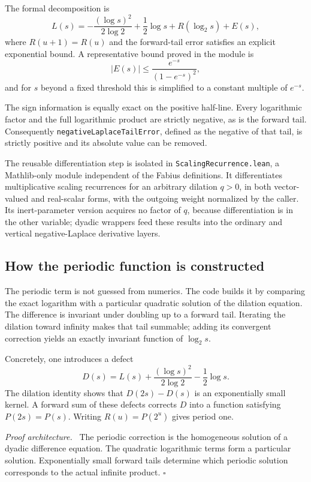 \documentclass[11pt,oneside]{article}
\theoremstyle{definition}
\theoremstyle{remark}
\newenvironment{proofidea}{\par\smallskip\noindent\textit{Proof architecture.}\ }{\hfill$\square$\par\smallskip}
\begin{document}
The formal decomposition is
\[
  L(s)=
  -\frac{(\log s)^2}{2\log2}
  +\frac12\log s
  +R(\log_2s)
  +E(s),
\]
where \(R(u+1)=R(u)\) and the forward-tail error satisfies an explicit exponential bound.  A representative bound proved in the module is
\[
  |E(s)|\leq\frac{e^{-s}}{(1-e^{-s})^2},
\]
and for \(s\) beyond a fixed threshold this is simplified to a constant multiple of \(e^{-s}\).

The sign information is equally exact on the positive half-line.  Every
logarithmic factor and the full logarithmic product are strictly negative,
as is the forward tail.  Consequently
\nolinkurl{negativeLaplaceTailError}, defined as the negative of that tail,
is strictly positive and its absolute value can be removed.

The reusable differentiation step is isolated in
\nolinkurl{ScalingRecurrence.lean}, a Mathlib-only module independent of the
Fabius definitions.  It differentiates multiplicative scaling recurrences
for an arbitrary dilation \(q>0\), in both vector-valued and real-scalar
forms, with the outgoing weight normalized by the caller.  Its inert-parameter
version acquires no factor of \(q\), because differentiation is in the other
variable; dyadic wrappers feed these results into the ordinary and vertical
negative-Laplace derivative layers.

\subsection{How the periodic function is constructed}
The periodic term is not guessed from numerics.  The code builds it by comparing the exact logarithm with a particular quadratic solution of the dilation equation.  The difference is invariant under doubling up to a forward tail.  Iterating the dilation toward infinity makes that tail summable; adding its convergent correction yields an exactly invariant function of \(\log_2s\).

Concretely, one introduces a defect
\[
  D(s)=L(s)+\frac{(\log s)^2}{2\log2}-\frac12\log s.
\]
The dilation identity shows that \(D(2s)-D(s)\) is an exponentially small kernel.  A forward sum of these defects corrects \(D\) into a function satisfying \(P(2s)=P(s)\).  Writing \(R(u)=P(2^u)\) gives period one.

\begin{proofidea}
The periodic correction is the homogeneous solution of a dyadic difference equation.  The quadratic logarithmic terms form a particular solution.  Exponentially small forward tails determine which periodic solution corresponds to the actual infinite product.
\end{proofidea}
\end{document}
